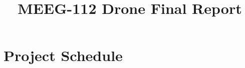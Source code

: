 \documentclass[12pt,oneside,letterpaper,english]{article}
\title{MEEG-112 Drone Final Report} %
\begin{document}
\doublespacing
{} 

\begin{singlespace}
    
\end{singlespace}


\newpage
{} 

% 

\section{Project Schedule} \label{ch1}
 


\end{document}
